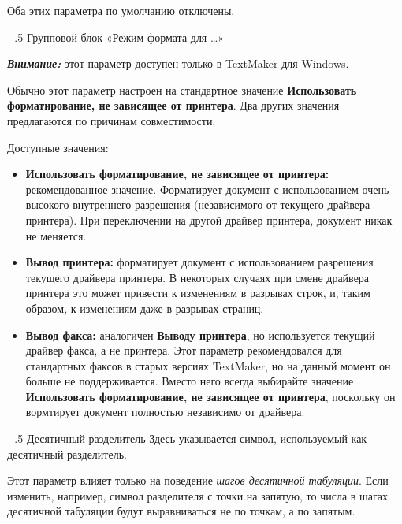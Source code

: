 ﻿\documentclass[a4paper,10pt]{article}
\makeatletter
\renewcommand\paragraph{%
   \@startsection{paragraph}{4}{0mm}%
      {-\baselineskip}%
      {.5\baselineskip}%
      {\normalfont\normalsize\bfseries}}
\makeatother
\begin{document}
 Оба этих параметра по умолчанию отключены.
 
 \paragraph{Групповой блок «Режим формата для …»}
 \begin{mdframed}[backgroundcolor=blue!10]
\textbf{\textit{Внимание:}} этот параметр доступен только в TextMaker для Windows.
\end{mdframed}

Обычно этот параметр настроен на стандартное значение \textbf{Использовать форматирование, не зависящее от принтера}. Два других значения предлагаются по причинам совместимости.

Доступные значения:

\begin{itemize}
 \item \textbf{Использовать форматирование, не зависящее от принтера:} рекомендованное значение. Форматирует документ с использованием очень высокого внутреннего разрешения (независимого от текущего драйвера принтера). При переключении на другой драйвер принтера, документ никак не меняется.
 \item \textbf{Вывод принтера:} форматирует документ с использованием разрешения текущего драйвера принтера. В некоторых случаях при смене драйвера принтера это может привести к изменениям в разрывах строк, и, таким образом, к изменениям даже в разрывах страниц.
 \item \textbf{Вывод факса:} аналогичен \textbf{Выводу принтера}, но используется текущий драйвер факса, а не принтера. Этот параметр рекомендовался для стандартных факсов в старых версиях TextMaker, но на данный момент он больше не поддерживается. Вместо него всегда выбирайте значение \textbf{Использовать форматирование, не зависящее от принтера}, поскольку он вормтирует документ полностью независимо от драйвера.
\end{itemize}

\paragraph{Десятичный разделитель}
Здесь указывается символ, используемый как десятичный разделитель.

Этот параметр влияет только на поведение \textit{шагов десятичной табуляции}. Если изменить, например, символ разделителя с точки на запятую, то числа в шагах десятичной табуляции будут выравниваться не по точкам, а по запятым.
\end{document}
